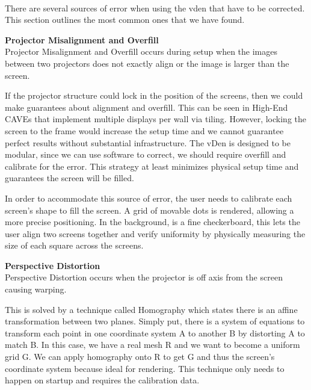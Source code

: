 \filbreak
{}\label{sec:calibrationSection} \\

There are several sources of error when using the vden that have to be corrected. This section outlines the most common ones that we have found.

\filbreak
\noindent\textbf{Projector Misalignment and Overfill} \\
Projector Misalignment and Overfill occurs during setup when the images between two projectors does not exactly align or the image is larger than the screen. 

If the projector structure could lock in the position of the screens, then we could make guarantees about alignment and overfill. This can be seen in High-End CAVEs that implement multiple displays per wall via tiling. However, locking the screen to the frame would increase the setup time and we cannot guarantee perfect results without substantial infrastructure. The vDen is designed to be modular, since we can use software to correct, we should require overfill and calibrate for the error. This strategy at least minimizes physical setup time and guarantees the screen will be filled.

In order to accommodate this source of error, the user needs to calibrate each screen's shape to fill the screen. A grid of movable dots is rendered, allowing a more precise positioning. In the background, is a fine checkerboard, this lets the user align two screens together and verify uniformity by physically measuring the size of each square across the screens.

\filbreak
\noindent\textbf{Perspective Distortion} \\
Perspective Distortion occurs when the projector is off axis from the screen causing warping.

This is solved by a technique called Homography which states there is an affine transformation between two planes. Simply put, there is a system of equations to transform each point in one coordinate system A to another B by distorting A to match B. In this case, we have a real mesh R and we want to become a uniform grid G. We can apply homography onto R to get G and thus the screen's coordinate system because ideal for rendering. This technique only needs to happen on startup and requires the calibration data.

\label{sec:dashboardSection} \\

\clearpage
